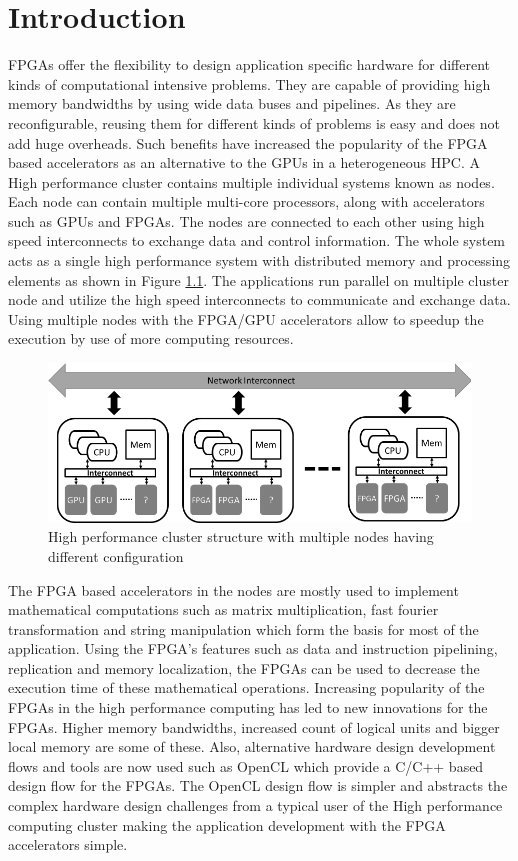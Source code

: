 \chapter{Introduction}
\label{cha:Introduction}

FPGAs offer the flexibility to design application specific hardware
for different kinds of computational intensive problems. They are capable
of providing high memory bandwidths by using wide data buses and pipelines.
As they are reconfigurable, reusing them for different kinds of problems
is easy and does not add huge overheads. Such benefits have increased
the popularity of the FPGA based accelerators as an alternative to the
GPUs in a heterogeneous \ac{HPC}.
A High performance cluster contains multiple individual
systems known as nodes. Each node can contain multiple multi-core processors,
along with accelerators such as GPUs and FPGAs. The nodes are connected to each other
using high speed interconnects to exchange data and control information. The whole system acts
as a single high performance system with distributed memory and processing elements as
shown in Figure \ref{fig:cluster}. The applications run parallel on multiple cluster node
and utilize the high speed interconnects to communicate and exchange data. Using
multiple nodes with the FPGA/GPU accelerators allow to speedup the execution by use of more computing resources.
\begin{figure}[ht]%
    \centering
    \includegraphics[width=1.0\textwidth]{images/cluster}
    \caption{High performance cluster structure with multiple nodes having different configuration}
    \label{fig:cluster}
\end{figure}

The FPGA based accelerators in the nodes are mostly used to implement mathematical computations such
as matrix multiplication, fast fourier transformation and string manipulation which form the
basis for most of the application. Using the FPGA's features such as data and instruction pipelining,
replication and memory localization, the FPGAs can be used to decrease the execution time of
these mathematical operations. Increasing popularity of the FPGAs in the high performance
computing has led to new innovations for the FPGAs. Higher memory bandwidths, increased count
of logical units and bigger local memory are some of these. Also, alternative hardware design development
flows and tools are now used such as OpenCL which provide a C/C++ based design flow for
the FPGAs. The OpenCL design flow is simpler and abstracts the complex hardware design
challenges from a typical user of the High performance computing cluster making
the application development with the FPGA accelerators simple.

